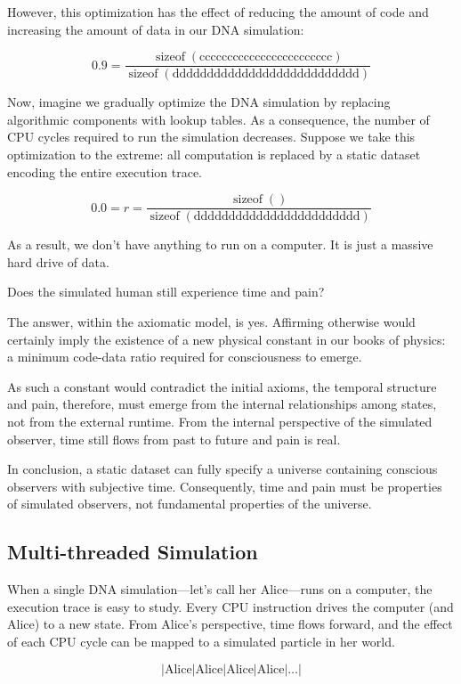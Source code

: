 However, this optimization has the effect of reducing the amount of code and increasing the amount of data in our DNA simulation:

\[
0.9 = \frac{\operatorname{sizeof}(\text{cccccccccccccccccccccccc})}
          {\operatorname{sizeof}(\text{ddddddddddddddddddddddddddd})}
\]

Now, imagine we gradually optimize the DNA simulation by replacing algorithmic components with lookup tables. As a consequence, the number of CPU cycles required to run the simulation decreases. Suppose we take this optimization to the extreme: all computation is replaced by a static dataset encoding the entire execution trace.

\[
0.0 = r = \frac{\operatorname{sizeof}(\text{})}
          {\operatorname{sizeof}(\text{dddddddddddddddddddddddd})}
\]

As a result, we don't have anything to run on a computer. It is just a massive hard drive of data.

Does the simulated human still experience time and pain? 

The answer, within the axiomatic model, is yes. Affirming otherwise would certainly imply the existence of a new physical constant in our books of physics: a minimum code-data ratio required for consciousness to emerge.

As such a constant would contradict the initial axioms, the temporal structure and pain, therefore, must emerge from the internal relationships among states, not from the external runtime.
From the internal perspective of the simulated observer, time still flows from past to future and pain is real.

In conclusion, a static dataset can fully specify a universe containing conscious observers with subjective time. Consequently, time and pain must be properties of simulated observers, not fundamental properties of the universe.


\subsection*{Multi-threaded Simulation}

When a single DNA simulation---let's call her Alice---runs on a computer, the execution trace is easy to study. Every CPU instruction drives the computer (and Alice) to a new state. From Alice's perspective, time flows forward, and the effect of each CPU cycle can be mapped to a simulated particle in her world.

\[
| \text{Alice}|\text{Alice}|\text{Alice}|\text{Alice}|\dots|
\]

